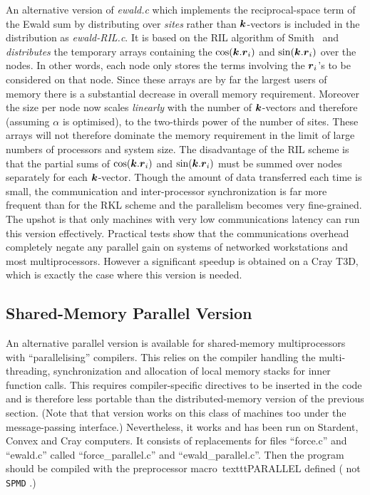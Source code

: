 \documentclass[twoside]{report}
\newcommand{\bm}[1]{\mbox{\boldmath \protect\(#1\protect\)}}
\begin{document}
An alternative version of {\em ewald.c}\/ which implements the
reciprocal-space term of the Ewald sum by distributing over {\em
  sites}\/ rather than $\bm{k}$-vectors is included in the
distribution as {\em ewald-RIL.c}.  It is based on the RIL algorithm
of Smith~\cite{smith:92} and {\em distributes}\/ the temporary arrays
containing the $\cos(\bm{k}.\bm{r}_i)$ and $\sin(\bm{k}.\bm{r}_i)$ over
the nodes. In other words, each node only stores the terms involving
the $\bm{r}_i$'s to be considered on that node.  Since these arrays
are by far the largest users of memory there is a substantial decrease
in overall memory requirement.  Moreover the size per node now scales
{\em linearly}\/ with the number of $\bm{k}$-vectors and therefore
(assuming $\alpha$ is optimised), to the two-thirds power of the
number of sites.  These arrays will not therefore dominate the memory
requirement in the limit of large numbers of processors and system
size.  The disadvantage of the RIL scheme is that the partial sums of
$\cos(\bm{k}.\bm{r}_i)$ and $\sin(\bm{k}.\bm{r}_i)$ must be summed over
nodes separately for each $\bm{k}$-vector. Though the amount of data
transferred each time is small, the communication and inter-processor
synchronization is far more frequent than for the RKL scheme and the
parallelism becomes very fine-grained.  The upshot is that only
machines with very low communications latency can run this version
effectively.  Practical tests show that the communications overhead
completely negate any parallel gain on systems of networked
workstations and most multiprocessors.  However a significant speedup
is obtained on a Cray T3D, which is exactly the case where this
version is needed.

\subsection{Shared-Memory Parallel Version}
\label{sec:shmpar}
An alternative parallel version is available for shared-memory
multiprocessors with ``parallelising'' compilers.  This relies on the
compiler handling the multi-threading, synchronization and allocation
of local memory stacks for inner function calls. This requires
compiler-specific directives to be inserted in the code and is
therefore less portable than the distributed-memory version of the
previous section. (Note that that version works on this class of
machines too under the message-passing interface.) Nevertheless, it
works and has been run on Stardent, Convex and Cray computers.  It
consists of replacements for files ``force.c'' and ``ewald.c'' called
``force\_parallel.c'' and ``ewald\_parallel.c''. Then the program
should be compiled with the preprocessor macro\ texttt{PARALLEL}
defined ( not \texttt{SPMD} .)
\end{document}
